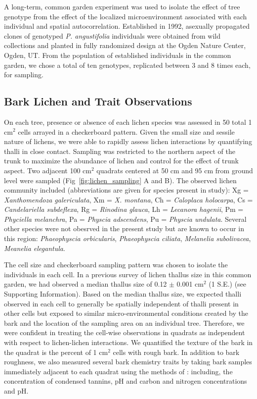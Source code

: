 \documentclass[fleqn,12pt]{olplainarticle}
\begin{document}
A long-term, common garden experiment was used to isolate the effect
of tree genotype from the effect of the localized microenvironment
associated with each individual and spatial
autocorrelation. Established in 1992, asexually propagated clones of
genotyped \textit{P. angustifolia} individuals were obtained from wild
collections and planted in fully randomized design at the Ogden Nature
Center, Ogden, UT. From the population of established individuals in
the common garden, we chose a total of ten genotypes, replicated
between 3 and 8 times each, for sampling.



\subsection*{Bark Lichen and Trait Observations}


On each tree, presence or absence of each lichen species was assessed
in 50 total 1 cm$^2$ cells arrayed in a checkerboard pattern. Given
the small size and sessile nature of lichens, we were able to rapidly
assess lichen interactions by quantifying thalli in close
contact. Sampling was restricted to the northern aspect of the trunk
to maximize the abundance of lichen and control for the effect of
trunk aspect. Two adjacent 100 cm$^2$ quadrats centered at 50 cm and
95 cm from ground level were sampled (Fig~\ref{fig:lichen_sampling} A
and B). The observed lichen community included (abbreviations are
given for species present in study): Xg = \textit{Xanthomendoza
  galericulata}, Xm = \textit{X. montana}, Ch = \textit{Caloplaca
  holocarpa}, Cs = \textit{Candelariella subdeflexa}, Rg =
\textit{Rinodina glauca}, Lh = \textit{Lecanora hagenii}, Pm =
\textit{Phyciella melanchra}, Pa = \textit{Physcia adscendens}, Pu =
\textit{Physcia undulata}. Several other species were not obesrved in
the present study but are known to occur in this region:
\textit{Phaeophyscia orbicularis}, \textit{Phaeophyscia ciliata},
\textit{Melanelia subolivacea}, \textit{Meanelia elegantula}.


The cell size and checkerboard sampling pattern was chosen to isolate
the individuals in each cell. In a previous survey of lichen thallus
size in this common garden, we had observed a median thallus size of
0.12 $\pm$ 0.001 cm$^2$ (1 S.E.) (see Supporting Information). Based
on the median thallus size, we expected thalli observed in each cell
to generally be spatially independent of thalli present in other cells
but exposed to similar micro-environmental conditions created by the
bark and the location of the sampling area on an individual
tree. Therefore, we were confident in treating the cell-wise
observations in quadrats as independent with respect to lichen-lichen
interactions. We quantified the texture of the bark in the quadrat is
the percent of 1 cm$^2$ cells with rough bark. In addition to bark
roughness, we also measured several bark chemistry traits by taking
bark samples immediately adjacent to each quadrat using the methods of
\citep{Lamit2011}: including, the concentration of condensed tannins,
pH and carbon and nitrogen concentrations and pH.
\end{document}
